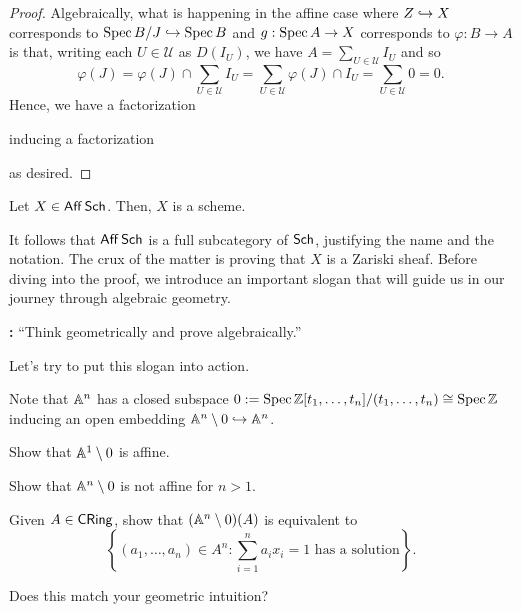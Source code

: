 \documentclass[11pt]{article}
\renewcommand{\phi}{\varphi}
\newcommand{\U}{\mathscr{U}}
\begin{document}
\begin{proof}
Algebraically, what is happening in the affine case where $Z\hookrightarrow X$ corresponds to $\operatorname{Spec} B/J\hookrightarrow\operatorname{Spec} B$ and $g: \operatorname{Spec} A\to X$ corresponds to $\phi: B\to A$ is that, writing each $U\in\U$ as $D(I_U)$, we have $A=\sum_{U\in\U}I_U$ and so 
$$\phi(J)=\phi(J)\cap\sum_{U\in\U}I_U=\sum_{U\in\U}\phi(J)\cap I_U=\sum_{U\in\U}0=0.$$
Hence, we have a factorization
\begin{center}
\end{center}
inducing a factorization
\begin{center}
\end{center}
as desired.
\end{proof}

\begin{theorem}
Let $X\in\operatorname{\mathsf{Aff}}\operatorname{\mathsf{Sch}}$. Then, $X$ is a scheme.
\end{theorem}

It follows that $\operatorname{\mathsf{Aff}}\operatorname{\mathsf{Sch}}$ is a full subcategory of $\operatorname{\mathsf{Sch}}$, justifying the name and the notation. The crux of the matter is proving that $X$ is a Zariski sheaf. Before diving into the proof, we introduce an important slogan that will guide us in our journey through algebraic geometry.

\textbf{:} ``Think geometrically and prove algebraically.''

Let's try to put this slogan into action.

\begin{exercise}
Note that $\mathbb{A}^n$ has a closed subspace $0:=\operatorname{Spec}\mathbb{Z}[t_1,\ldots,t_n]/(t_1,\ldots,t_n)\cong\operatorname{Spec}\mathbb{Z}$ inducing an open embedding $\mathbb{A}^n\setminus0\hookrightarrow\mathbb{A}^n$.
\begin{enum}{\alph}
\item Show that $\mathbb{A}^1\setminus0$ is affine.

\item Show that $\mathbb{A}^n\setminus0$ is not affine for $n>1$.

\item Given $A\in\operatorname{\mathsf{CRing}}$, show that $(\mathbb{A}^n\setminus0)(A)$ is equivalent to 
$$\left\{(a_1,\ldots,a_n)\in A^n : \sum_{i=1}^na_ix_i=1\textrm{ has a solution}\right\}.$$

\item Does this match your geometric intuition?
\end{enum}
\end{exercise}
\end{document}
